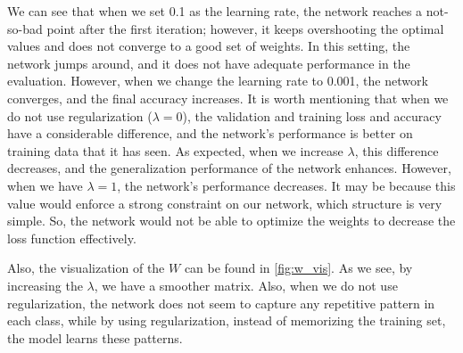 \documentclass[a4paper]{article}
\begin{document}
We can see that when we set 0.1 as the learning rate, the network reaches a not-so-bad point after the first iteration; however, it keeps overshooting the optimal values and does not converge to a good set of weights. In this setting, the network jumps around, and it does not have adequate performance in the evaluation. However, when we change the learning rate to 0.001, the network converges, and the final accuracy increases. It is worth mentioning that when we do not use regularization ($\lambda=0$), the validation and training loss and accuracy have a considerable difference, and the network's performance is better on training data that it has seen. As expected, when we increase $\lambda$, this difference decreases, and the generalization performance of the network enhances. However, when we have $\lambda = 1$, the network's performance decreases. It may be because this value would enforce a strong constraint on our network, which structure is very simple. So, the network would not be able to optimize the weights to decrease the loss function effectively.

Also, the visualization of the $W$ can be found in \autoref{fig:w_vis}. As we see, by increasing the $\lambda$, we have a smoother matrix. Also, when we do not use regularization, the network does not seem to capture any repetitive pattern in each class, while by using regularization, instead of memorizing the training set, the model learns these patterns.
\end{document}

